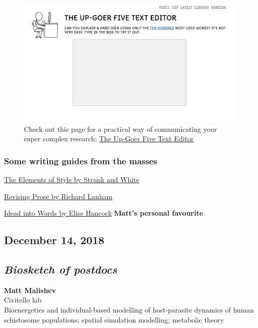\documentclass[10,portrait]{article}
\begin{document}
\begin{figure}
\centering
\includegraphics{upgoer5.jpeg}
\caption{Check out this page for a practical way of communicating your
super complex research: \href{http://splasho.com/upgoer5/}{The Up-Goer
Five Text Editor}}
\end{figure}

\subsubsection{Some writing guides from the
masses}\label{some-writing-guides-from-the-masses}

\href{https://www.amazon.com/Elements-Style-William-Strunk-Jr/dp/194564401X}{The
Elements of Style by Strunk and White}

\href{http://people.vetmed.wsu.edu/jmgay/courses/documents/TheParamedicMethod.pdf}{Revising
Prose by Richard Lanham}

\href{https://www.amazon.com/Ideas-into-Words-Mastering-Science/dp/0801873304/ref=pd_sim_b_1}{Idead
into Words by Elise Hancock} \textbf{Matt's personal favourite}

\newpage    

\subsection{December 14, 2018}\label{december-14-2018}

\subsection{\texorpdfstring{\emph{Biosketch of
postdocs}}{Biosketch of postdocs}}\label{biosketch-of-postdocs}

\textbf{Matt Malishev}\\
Civitello lab\\
Bioenergetics and individual-based modelling of host-parasite dynamics
of human schistosome populations; spatial simulation modelling;
metabolic theory
\end{document}
